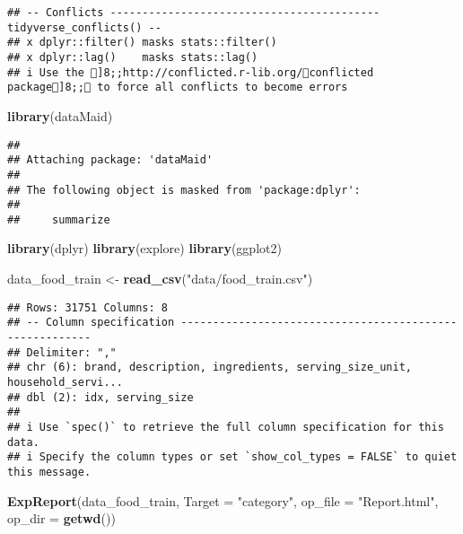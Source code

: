 \documentclass[
]{article}
\newenvironment{Shaded}{\begin{snugshade}}{\end{snugshade}}
\newcommand{\AttributeTok}[1]{\textcolor[rgb]{0.13,0.29,0.53}{#1}}
\newcommand{\FunctionTok}[1]{\textcolor[rgb]{0.13,0.29,0.53}{\textbf{#1}}}
\newcommand{\NormalTok}[1]{#1}
\newcommand{\OtherTok}[1]{\textcolor[rgb]{0.56,0.35,0.01}{#1}}
\newcommand{\StringTok}[1]{\textcolor[rgb]{0.31,0.60,0.02}{#1}}
\begin{document}
\begin{verbatim}
## -- Conflicts ------------------------------------------ tidyverse_conflicts() --
## x dplyr::filter() masks stats::filter()
## x dplyr::lag()    masks stats::lag()
## i Use the ]8;;http://conflicted.r-lib.org/conflicted package]8;; to force all conflicts to become errors
\end{verbatim}

\begin{Shaded}
\begin{Highlighting}[]
\FunctionTok{library}\NormalTok{(dataMaid)}
\end{Highlighting}
\end{Shaded}

\begin{verbatim}
## 
## Attaching package: 'dataMaid'
## 
## The following object is masked from 'package:dplyr':
## 
##     summarize
\end{verbatim}

\begin{Shaded}
\begin{Highlighting}[]
\FunctionTok{library}\NormalTok{(dplyr)}
\FunctionTok{library}\NormalTok{(explore)}
\FunctionTok{library}\NormalTok{(ggplot2)}
\end{Highlighting}
\end{Shaded}

\begin{Shaded}
\begin{Highlighting}[]
\NormalTok{data\_food\_train }\OtherTok{\textless{}{-}} \FunctionTok{read\_csv}\NormalTok{(}\StringTok{"data/food\_train.csv"}\NormalTok{)}
\end{Highlighting}
\end{Shaded}

\begin{verbatim}
## Rows: 31751 Columns: 8
## -- Column specification --------------------------------------------------------
## Delimiter: ","
## chr (6): brand, description, ingredients, serving_size_unit, household_servi...
## dbl (2): idx, serving_size
## 
## i Use `spec()` to retrieve the full column specification for this data.
## i Specify the column types or set `show_col_types = FALSE` to quiet this message.
\end{verbatim}

\begin{Shaded}
\begin{Highlighting}[]
\FunctionTok{ExpReport}\NormalTok{(data\_food\_train, }\AttributeTok{Target =} \StringTok{"category"}\NormalTok{, }\AttributeTok{op\_file =} \StringTok{"Report.html"}\NormalTok{, }\AttributeTok{op\_dir =} \FunctionTok{getwd}\NormalTok{())}
\end{Highlighting}
\end{Shaded}
\end{document}
